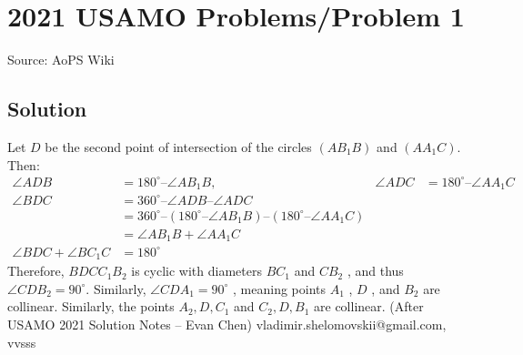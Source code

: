 \documentclass[12pt]{article}
\begin{document}
\section*{{2021 USAMO Problems/Problem 1}}
Source: AoPS Wiki

\subsection*{Solution}
Let $D$ be the second point of intersection of the circles $(AB_1B)$ and $(AA_1C).$ Then: \begin{align*} \angle ADB &= 180^\circ – \angle AB_1B,&\angle ADC &= 180^\circ – \angle AA_1C\\ \angle BDC &= 360^\circ – \angle ADB – \angle ADC\\ &= 360^\circ – (180^\circ – \angle AB_1B) – (180^\circ – \angle AA_1C)\\ &= \angle AB_1B + \angle AA_1C\\ \angle BDC + \angle BC_1C &= 180^\circ \end{align*} Therefore, $BDCC_1B_2$ is cyclic with diameters $BC_1$ and $CB_2$ , and thus $\angle CDB_2 = 90^\circ.$ Similarly, $\angle CDA_1 = 90^\circ$ , meaning points $A_1$ , $D$ , and $B_2$ are collinear. Similarly, the points $A_2, D, C_1$ and $C_2, D, B_1$ are collinear. (After USAMO 2021 Solution Notes – Evan Chen) vladimir.shelomovskii@gmail.com, vvsss
\end{document}
